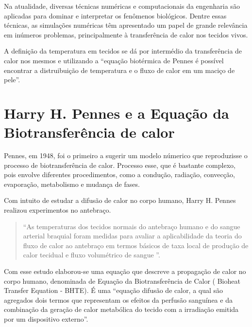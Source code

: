  Na atualidade, diversas técnicas numéricas e computacionais da engenharia são aplicadas para dominar e interpretar os fenômenos biológicos. Dentre essas técnicas, as simulações numéricas têm apresentado um papel de grande relevância em inúmeros problemas, principalmente à transferência de calor nos tecidos vivos. 
 
A definição da temperatura em tecidos se dá por intermédio da transferência de calor nos mesmos e utilizando a ``equação biotérmica de Pennes é possível encontrar a distruibuição de temperatura e o fluxo de calor em um maciço de pele''\cite{Fabricio}. %






\section{Harry H. Pennes e a Equação da Biotransferência de calor}

     Pennes, em 1948, foi o primeiro a sugerir um modelo númerico que reproduzisse o processo de biotransferência de calor. Processo esse, que é bastante complexo, pois envolve diferentes procedimentos, como a condução, radiação, convecção, evaporação, metabolismo e mudança de fases\cite{Marcus}.
     
     Com intuito de estudar a difusão de calor no corpo humano, Harry H. Pennes realizou experimentos no antebraço.
      
      \begin{quotation}
     ``As temperaturas dos tecidos normais do antebraço humano e do sangue arterial braquial foram medidas para avaliar a aplicabilidade da teoria do fluxo de calor ao antebraço em termos básicos de taxa local de produção de calor tecidual e fluxo volumétrico de sangue ''\cite[p.93]{PENNES}. \end{quotation}

   Com esse estudo elaborou-se uma equação que descreve a propagação de calor no corpo humano, denominada de Equação da Biotransferência de Calor ( Bioheat Transfer Equation - BHTE). É uma ``equação difusão de calor, a
qual são agregados dois termos que representam os efeitos da perfusão sanguínea e da
combinação da geração de calor metabólica do tecido com a irradiação emitida por um dispositivo externo''\cite[p.26]{Marcus}.
   
